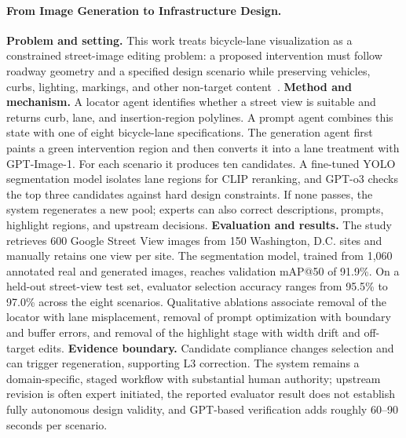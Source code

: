 \paragraph{From Image Generation to Infrastructure Design.}
\textbf{Problem and setting.} This work treats bicycle-lane visualization as a constrained street-image editing problem: a proposed intervention must follow roadway geometry and a specified design scenario while preserving vehicles, curbs, lighting, markings, and other non-target content~\cite{avg250905469}. \textbf{Method and mechanism.} A locator agent identifies whether a street view is suitable and returns curb, lane, and insertion-region polylines. A prompt agent combines this state with one of eight bicycle-lane specifications. The generation agent first paints a green intervention region and then converts it into a lane treatment with GPT-Image-1. For each scenario it produces ten candidates. A fine-tuned YOLO segmentation model isolates lane regions for CLIP reranking, and GPT-o3 checks the top three candidates against hard design constraints. If none passes, the system regenerates a new pool; experts can also correct descriptions, prompts, highlight regions, and upstream decisions. \textbf{Evaluation and results.} The study retrieves 600 Google Street View images from 150 Washington, D.C. sites and manually retains one view per site. The segmentation model, trained from 1,060 annotated real and generated images, reaches validation mAP@50 of 91.9\%. On a held-out street-view test set, evaluator selection accuracy ranges from 95.5\% to 97.0\% across the eight scenarios. Qualitative ablations associate removal of the locator with lane misplacement, removal of prompt optimization with boundary and buffer errors, and removal of the highlight stage with width drift and off-target edits. \textbf{Evidence boundary.} Candidate compliance changes selection and can trigger regeneration, supporting L3 correction. The system remains a domain-specific, staged workflow with substantial human authority; upstream revision is often expert initiated, the reported evaluator result does not establish fully autonomous design validity, and GPT-based verification adds roughly 60--90 seconds per scenario.

